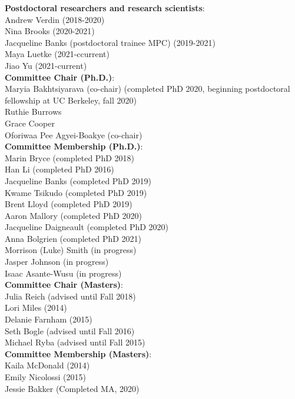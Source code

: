 \documentclass[11pt]{article} %
\begin{document}
\noindent
\textbf{Postdoctoral researchers and research scientists}:\\
Andrew Verdin (2018-2020)\\
Nina Brooks (2020-2021)\\
Jacqueline Banks (postdoctoral trainee MPC) (2019-2021)\\
Maya Luetke (2021-ccurrent)\\
Jiao Yu (2021-current)\\


\noindent
\textbf{Committee Chair (Ph.D.)}: \\
Maryia Bakhtsiyarava (co-chair) (completed PhD 2020, beginning postdoctoral fellowship at UC Berkeley, fall 2020)\\
Ruthie Burrows\\
Grace Cooper\\
Oforiwaa Pee Agyei-Boakye (co-chair)\\

\noindent
\textbf{Committee Membership (Ph.D.)}: \\
Marin Bryce (completed PhD 2018)\\
Han Li (completed PhD 2016)\\
Jacqueline Banks (completed PhD 2019)\\
Kwame Tsikudo (completed PhD 2019)\\
Brent Lloyd (completed PhD 2019)\\
Aaron Mallory (completed PhD 2020)\\
Jacqueline Daigneault (completed PhD 2020) \\
Anna Bolgrien (completed PhD 2021)\\
Morrison (Luke) Smith (in progress) \\
Jasper Johnson (in progress)\\
Isaac Asante-Wusu (in progress) \\

\noindent
\textbf{Committee Chair (Masters)}: \\
Julia Reich (advised until Fall 2018)\\
 Lori Miles (2014) \\
 Delanie Farnham (2015)\\
 Seth Bogle (advised until Fall 2016) \\
 Michael Ryba (advised until Fall 2015)\\


\noindent
\textbf{Committee Membership (Masters)}: \\
Kaila McDonald (2014)\\
Emily Nicolossi (2015) \\
Jessie Bakker (Completed MA, 2020)\\
\end{document}
